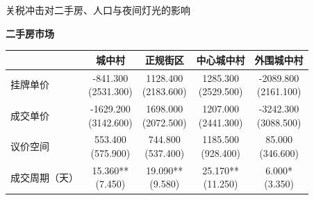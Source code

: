 \documentclass[aspectratio=169,10pt]{ctexbeamer}
\begin{document}
\begin{frame}[plain]{关税冲击对二手房、人口与夜间灯光的影响}
  \centering
  \scriptsize
  \begin{minipage}[t]{0.97\textwidth}
    \centering
    \textbf{二手房市场}
    \vspace{0.2em}
    \begin{tabular}{lcccc}
      \toprule
       & 城中村 & 正规街区 & 中心城中村 & 外围城中村 \\
      \midrule
      挂牌单价 & \makecell{-841.300\\(2531.300)} & \makecell{1128.400\\(2183.600)} & \makecell{1285.300\\(2529.500)} & \makecell{-2089.800\\(2161.100)} \\
      成交单价 & \makecell{-1629.200\\(3142.600)} & \makecell{1698.000\\(2072.500)} & \makecell{1207.000\\(2441.300)} & \makecell{-3242.300\\(3088.500)} \\
      议价空间 & \makecell{553.400\\(575.900)} & \makecell{744.800\\(537.400)} & \makecell{1185.500\\(928.400)} & \makecell{85.000\\(346.600)} \\
      成交周期（天） & \makecell{15.360**\\(7.450)} & \makecell{19.090**\\(9.580)} & \makecell{25.170**\\(11.250)} & \makecell{6.000*\\(3.350)} \\
      \bottomrule
    \end{tabular}
  \end{minipage}

  \vspace{0.5em}


\end{frame}
\end{document}
